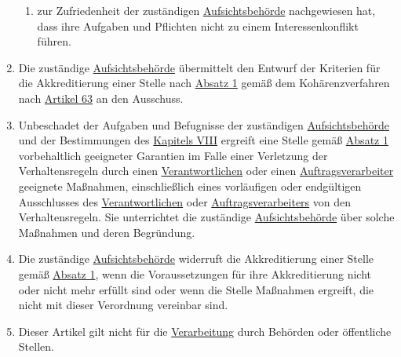 \begin{enumerate}
\begin{enumerate}
    \item zur Zufriedenheit der zuständigen \hyperref[itm:04-21]{Aufsichtsbehörde} nachgewiesen hat, dass ihre Aufgaben
     und Pflichten nicht zu einem Interessenkonflikt führen.
    \label{itm:41-2d}

  \end{enumerate}

  \item Die zuständige \hyperref[itm:04-21]{Aufsichtsbehörde} übermittelt den Entwurf der Kriterien für die
   Akkreditierung einer Stelle nach
   \hyperref[itm:41-1]{Absatz 1} gemäß dem Kohärenzverfahren nach \hyperref[ch:63]{Artikel 63} an den Ausschuss.
  \label{itm:41-3}

  \item Unbeschadet der Aufgaben und Befugnisse der zuständigen \hyperref[itm:04-21]{Aufsichtsbehörde} und der
   Bestimmungen des \hyperref[part:8]{Kapitels VIII} ergreift eine Stelle gemäß \hyperref[itm:41-1]{Absatz 1}
   vorbehaltlich geeigneter Garantien im Falle einer Verletzung der Verhaltensregeln durch einen \hyperref[itm:04-7]
   {Verantwortlichen} oder einen \hyperref[itm:04-8]{Auftragsverarbeiter} geeignete Maßnahmen, einschließlich eines
   vorläufigen oder endgültigen Ausschlusses des \hyperref[itm:04-7]{Verantwortlichen} oder
   \hyperref[itm:04-8]{Auftragsverarbeiters} von den Verhaltensregeln. Sie unterrichtet die zuständige \hyperref
    [itm:04-21]{Aufsichtsbehörde} über solche Maßnahmen und deren Begründung.
  \label{itm:41-4}

  \item Die zuständige \hyperref[itm:04-21]{Aufsichtsbehörde} widerruft die Akkreditierung einer Stelle gemäß \hyperref
   [itm:41-1]{Absatz 1}, wenn die Voraussetzungen für ihre Akkreditierung nicht oder nicht mehr erfüllt sind oder wenn
   die Stelle Maßnahmen ergreift, die nicht mit dieser Verordnung vereinbar sind.
  \label{itm:41-5}

  \item Dieser Artikel gilt nicht für die \hyperref[itm:04-2]{Verarbeitung} durch Behörden oder öffentliche Stellen.
  \label{itm:41-6}

\end{enumerate}


